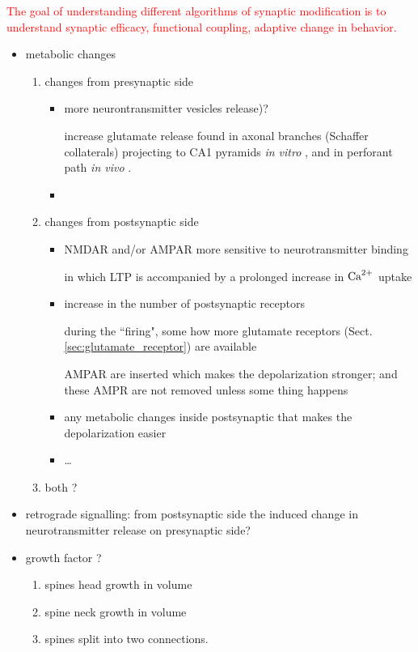 \textcolor{red}{The goal of understanding different algorithms of synaptic
modification is to understand synaptic efficacy, functional coupling, adaptive
change in behavior.}
\begin{itemize}
  \item metabolic changes
\begin{enumerate}
  \item changes from presynaptic side
  
  \begin{itemize}
    \item  more neurontransmitter vesicles
  release)? 
  
  increase glutamate release found in axonal branches (Schaffer collaterals)
  projecting to CA1 pyramids {\it in vitro} \citep{skrede1981}, and in perforant
  path {\it in vivo} \citep{dolphin1982}.
     
     \item 
  \end{itemize}
  
  \item changes from postsynaptic side 
  
  \begin{itemize}
    \item NMDAR and/or AMPAR more sensitive to
  neurotransmitter binding
  
  in which LTP is accompanied by a prolonged increase in ${\text{Ca}^{2+}}$ uptake
  
     \item increase in the number of postsynaptic receptors
     
     during the ``firing", some how more 
     glutamate receptors (Sect.\ref{sec:glutamate_receptor}) are available
     \citep{baudry1980}
      
     AMPAR are inserted which makes the
     depolarization stronger;  and these AMPR are not removed unless some thing
     happens
     
     \item any metabolic changes inside postsynaptic that makes the depolarization easier
     
     \item \ldots
  \end{itemize}
  
  \item both ?
\end{enumerate}

  \item retrograde signalling: from postsynaptic side the induced change in
  neurotransmitter release on presynaptic side?
  
  \item growth factor ?
  \begin{enumerate}
    \item spines head growth in volume
    \item spine neck growth in volume
    \item spines split into two connections.
  \end{enumerate}
\end{itemize}

